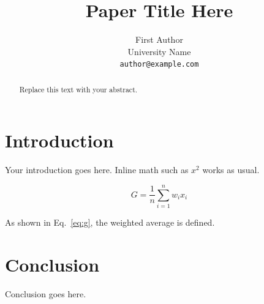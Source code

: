 \documentclass[10pt,twocolumn,letterpaper]{article}
\begin{document}
\title{Paper Title Here}

\author{First Author\\
University Name\\
{\tt\small author@example.com}
}

\maketitle

\begin{abstract}
Replace this text with your abstract.
\end{abstract}

\section{Introduction}
Your introduction goes here. Inline math such as $x^2$ works as usual.

\begin{equation}
G = \frac{1}{n}\sum_{i=1}^{n} w_i x_i
\label{eq:g}
\end{equation}

As shown in Eq.~\ref{eq:g}, the weighted average is defined.

\section{Conclusion}
Conclusion goes here.

{\small


}
\end{document}
